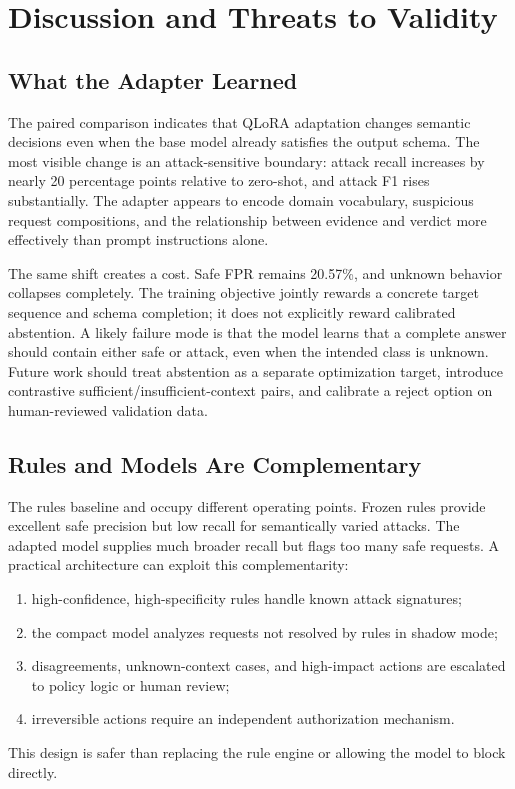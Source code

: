 \section{Discussion and Threats to Validity}
\label{sec:discussion}

\subsection{What the Adapter Learned}
The paired comparison indicates that QLoRA adaptation changes semantic decisions even when the base model already satisfies the output schema. The most visible change is an attack-sensitive boundary: attack recall increases by nearly 20 percentage points relative to zero-shot, and attack F1 rises substantially. The adapter appears to encode domain vocabulary, suspicious request compositions, and the relationship between evidence and verdict more effectively than prompt instructions alone.

The same shift creates a cost. Safe FPR remains 20.57\%, and unknown behavior collapses completely. The training objective jointly rewards a concrete target sequence and schema completion; it does not explicitly reward calibrated abstention. A likely failure mode is that the model learns that a complete answer should contain either safe or attack, even when the intended class is unknown. Future work should treat abstention as a separate optimization target, introduce contrastive sufficient/insufficient-context pairs, and calibrate a reject option on human-reviewed validation data.

\subsection{Rules and Models Are Complementary}
The rules baseline and \model{} occupy different operating points. Frozen rules provide excellent safe precision but low recall for semantically varied attacks. The adapted model supplies much broader recall but flags too many safe requests. A practical architecture can exploit this complementarity:
\begin{enumerate}
    \item high-confidence, high-specificity rules handle known attack signatures;
    \item the compact model analyzes requests not resolved by rules in shadow mode;
    \item disagreements, unknown-context cases, and high-impact actions are escalated to policy logic or human review;
    \item irreversible actions require an independent authorization mechanism.
\end{enumerate}
This design is safer than replacing the rule engine or allowing the model to block directly.


